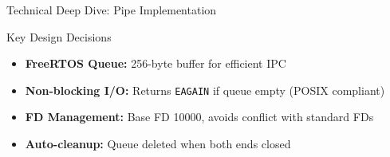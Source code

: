 \documentclass[aspectratio=169, 10pt]{beamer}
\begin{document}
\begin{frame}{Technical Deep Dive: Pipe Implementation}
    \vspace{0.1cm}
    \begin{exampleblock}{Key Design Decisions}
        \begin{itemize}\setlength{\itemsep}{2pt}
            \item \textbf{FreeRTOS Queue:} 256-byte buffer for efficient IPC
            \item \textbf{Non-blocking I/O:} Returns \texttt{EAGAIN} if queue empty (POSIX compliant)
            \item \textbf{FD Management:} Base FD 10000, avoids conflict with standard FDs
            \item \textbf{Auto-cleanup:} Queue deleted when both ends closed
        \end{itemize}
    \end{exampleblock}
\end{frame}
\end{document}
